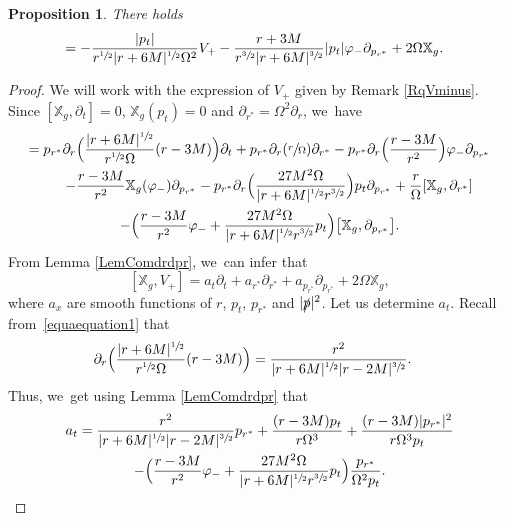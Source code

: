 \documentclass[JEP,XML,SOM,Unicode,published]{cedram}
\theoremstyle{plain}
\newtheorem{proposition}{Proposition}[section]
\theoremstyle{definition}
\newcommand\T{{\mathbb{X}}}
\begin{document}
\begin{proposition}\label{ProComVminus}
There holds
\begin{align*}
[\T_g,V_+] &= - \frac{|p_t|}{r^{\sfrac{1}{2}}|r+6M|^{\sfrac{1}{2}}\Omega^2} V_+- \frac{r+3M}{r^{\sfrac{3}{2}}|r+6M|^{\sfrac{3}{2}}}|p_t|\varphi_- \partial_{p_{r^*}} + 2\Omega \T_g.
\end{align*}
\end{proposition}

\begin{proof}
We will work with the expression of $V_+$ given by Remark \ref{RqVminus}. Since $[\T_g,\partial_t]=0$, $\T_g(p_t)=0$ and $\partial_{r^*}=\Omega^2 \partial_r$, we~have\vspace*{-5pt}
\begin{multline*}
[\T_g,V_+] = p_{r^*}\partial_{r} \Bigl(\frac{|r+6M|^{\sfrac{1}{2}}}{r^{\sfrac{1}{2}}\Omega}(r-3M) \Bigr) \partial_t+ p_{r^*}\partial_{r}(\sfrac{r}{\Omega}) \partial_{r^*} -p_{r^*} \partial_r \Bigl(\frac{r-3M}{r^2} \Bigr) \varphi_- \partial_{p_{r^*}} \\
\shoveright{- \frac{r-3M}{r^2} \T_g (\varphi_-) \partial_{p_{r^*}} -p_{r^*} \partial_r \Bigl(\frac{27M^2 \Omega}{|r+6M|^{\sfrac{1}{2}}r^{\sfrac{3}{2}}} \Bigr) p_t \partial_{p_{r^*}}+\frac{r}{\Omega}[\T_g, \partial_{r^*}]}\phantom{.}\\
-\Bigl(\frac{r-3M}{r^2} \varphi_- +\frac{27M^2 \Omega}{|r+6M|^{\sfrac{1}{2}}r^{\sfrac{3}{2}}}p_t \Bigr) \bigl[ \T_g, \partial_{p_{r^*}} \bigr].
\end{multline*}
From Lemma \ref{LemComdrdpr}, we~can infer that\vspace*{-3pt}
\[
[\T_g,V_+]= a_t \partial_t+a_{r^*} \partial_{r^*}+a_{p_{r^*}} \partial_{p_{r^*}}+ 2 \Omega \T_g,
\]
where $a_x$ are smooth functions of $r$, $p_t$, $p_{r^*}$ and $|\slashed{p}|^2$. Let us determine $a_{t}$. Recall from~\eqref{equaequation1} that\vspace*{-3pt}
\begin{align*}
\partial_r \Bigl(\frac{|r+6M|^{\sfrac{1}{2}}}{r^{\sfrac{1}{2}} \Omega} (r-3M) \Bigr) &= \frac{r^2}{|r+6M|^{\sfrac{1}{2}} |r-2M|^{\sfrac{3}{2}}}.
\end{align*}
Thus, we~get using Lemma \ref{LemComdrdpr} that\vspace*{-5pt}
\begin{multline*}
a_{t} = \frac{r^2}{|r+6M|^{\sfrac{1}{2}} |r-2M|^{\sfrac{3}{2}}}p_{r^*}+\frac{(r-3M)p_t}{r \Omega^3}+\frac{(r-3M)|p_{r^*}|^2}{r \Omega^3 p_t} \\
-\Bigl(\frac{r-3M}{r^2} \varphi_- +\frac{27M^2 \Omega}{|r+6M|^{\sfrac{1}{2}}r^{\sfrac{3}{2}}}p_t \Bigr) \frac{p_{r^*}}{ \Omega^2p_t}.

\end{multline*}
\end{proof}
\end{document}
